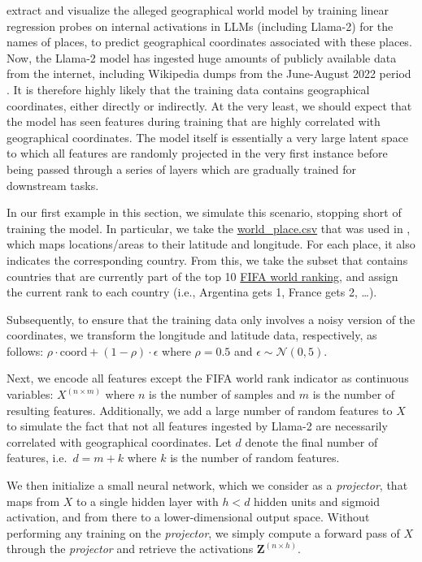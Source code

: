 \documentclass{article}
\theoremstyle{plain}
\theoremstyle{definition}
\theoremstyle{remark}
\begin{document}
\citet{gurnee2023languagev2} extract and visualize the alleged geographical world model by training linear regression probes on internal activations in LLMs (including Llama-2) for the names of places, to predict geographical coordinates associated with these places. Now, the Llama-2 model has ingested huge amounts of publicly available data from the internet, including Wikipedia dumps from the June-August 2022 period \citep{touvron2023llama}. It is therefore highly likely that the training data contains geographical coordinates, either directly or indirectly. At the very least, we should expect that the model has seen features during training that are highly correlated with geographical coordinates. The model itself is essentially a very large latent space to which all features are randomly projected in the very first instance before being passed through a series of layers which are gradually trained for downstream tasks.

In our first example in this section, we simulate this scenario, stopping short of training the model. In particular, we take the \href{https://github.com/wesg52/world-models/blob/main/data/entity_datasets/world_place.csv}{world\_place.csv} that was used in \citet{gurnee2023languagev2}, which maps locations/areas to their latitude and longitude. For each place, it also indicates the corresponding country. From this, we take the subset that contains countries that are currently part of the top 10 \href{https://www.fifa.com/fifa-world-ranking/men?dateId=id14142}{FIFA world ranking}, and assign the current rank to each country (i.e., Argentina gets 1, France gets 2, \ldots{}).

Subsequently, to ensure that the training data only involves a noisy version of the coordinates, we transform the longitude and latitude data, respectively, as follows: \(\rho \cdot \text{coord} + (1-\rho) \cdot \epsilon\) where \(\rho=0.5\) and \(\epsilon \sim \mathcal{N}(0, 5)\).

Next, we encode all features except the FIFA world rank indicator as continuous variables: \(X^{(n \times m)}\) where \(n\) is the number of samples and \(m\) is the number of resulting features. Additionally, we add a large number of random features to \(X\) to simulate the fact that not all features ingested by Llama-2 are necessarily correlated with geographical coordinates. Let \(d\) denote the final number of features, i.e.~\(d=m+k\) where \(k\) is the number of random features.

We then initialize a small neural network, which we consider as a \emph{projector}, that maps from \(X\) to a single hidden layer with \(h<d\) hidden units and sigmoid activation, and from there to a lower-dimensional output space. Without performing any training on the \emph{projector}, we simply compute a forward pass of \(X\) through the \emph{projector} and retrieve the activations \(\mathbf{Z}^{(n\times h)}\).
\end{document}
